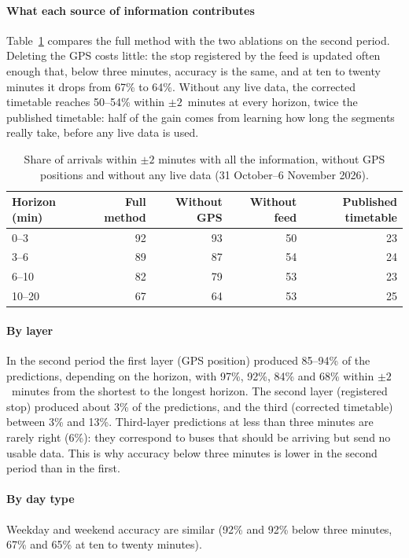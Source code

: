 \documentclass[preprint,11pt,nonatbib]{elsarticle}
\begin{document}
\paragraph{What each source of information contributes} Table~\ref{tab:ablation} compares the full method with the two
ablations on the second period. Deleting the GPS costs little: the stop registered by the feed is updated often
enough that, below three minutes, accuracy is the same, and at ten to twenty minutes it drops from 67\% to 64\%.
Without any live data, the corrected timetable reaches 50--54\% within $\pm2$~minutes at every horizon, twice the
published timetable: half of the gain comes from learning how long the segments really take, before any live data is
used.

\begin{table}[t]
\centering
\caption{Share of arrivals within $\pm2$ minutes with all the information, without GPS positions and without any
live data (31 October--6 November 2026).}
\label{tab:ablation}
\small
\begin{tabular}{@{}lrrrr@{}}
\toprule
Horizon (min) & Full method & Without GPS & Without feed & Published timetable \\
\midrule
0--3   & 92 & 93 & 50 & 23 \\
3--6   & 89 & 87 & 54 & 24 \\
6--10  & 82 & 79 & 53 & 23 \\
10--20 & 67 & 64 & 53 & 25 \\
\bottomrule
\end{tabular}
\end{table}

\paragraph{By layer} In the second period the first layer (GPS position) produced 85--94\% of the predictions,
depending on the horizon, with 97\%, 92\%, 84\% and 68\% within $\pm2$~minutes from the shortest to the longest
horizon. The second layer (registered stop) produced about 3\% of the predictions, and the third (corrected
timetable) between 3\% and 13\%. Third-layer predictions at less than three minutes are rarely right (6\%): they
correspond to buses that should be arriving but send no usable data. This is why accuracy below three minutes is
lower in the second period than in the first.

\paragraph{By day type} Weekday and weekend accuracy are similar (92\% and 92\% below three minutes, 67\% and 65\% at
ten to twenty minutes).
\end{document}
